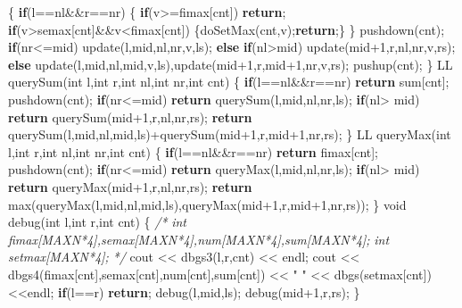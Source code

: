 \documentclass[
]{article}
\newenvironment{Shaded}{}{}
\newcommand{\CommentTok}[1]{\textcolor[rgb]{0.38,0.63,0.69}{\textit{#1}}}
\newcommand{\ControlFlowTok}[1]{\textcolor[rgb]{0.00,0.44,0.13}{\textbf{#1}}}
\newcommand{\DataTypeTok}[1]{\textcolor[rgb]{0.56,0.13,0.00}{#1}}
\newcommand{\DecValTok}[1]{\textcolor[rgb]{0.25,0.63,0.44}{#1}}
\newcommand{\NormalTok}[1]{#1}
\newcommand{\StringTok}[1]{\textcolor[rgb]{0.25,0.44,0.63}{#1}}
\begin{document}
\begin{Shaded}
\begin{Highlighting}[]
\NormalTok{\{}
    \ControlFlowTok{if}\NormalTok{(l==nl\&\&r==nr)}
\NormalTok{    \{}
        \ControlFlowTok{if}\NormalTok{(v\textgreater{}=fimax[cnt]) }\ControlFlowTok{return}\NormalTok{;}
        \ControlFlowTok{if}\NormalTok{(v\textgreater{}semax[cnt]\&\&v\textless{}fimax[cnt])}
\NormalTok{            \{doSetMax(cnt,v);}\ControlFlowTok{return}\NormalTok{;\}}
\NormalTok{    \}}
\NormalTok{    pushdown(cnt);}
    \ControlFlowTok{if}\NormalTok{(nr\textless{}=mid) update(l,mid,nl,nr,v,ls);}
    \ControlFlowTok{else} \ControlFlowTok{if}\NormalTok{(nl\textgreater{}mid) update(mid+}\DecValTok{1}\NormalTok{,r,nl,nr,v,rs);}
    \ControlFlowTok{else}\NormalTok{ update(l,mid,nl,mid,v,ls),update(mid+}\DecValTok{1}\NormalTok{,r,mid+}\DecValTok{1}\NormalTok{,nr,v,rs);}
\NormalTok{    pushup(cnt);}
\NormalTok{\}}
\NormalTok{LL querySum(}\DataTypeTok{int}\NormalTok{ l,}\DataTypeTok{int}\NormalTok{ r,}\DataTypeTok{int}\NormalTok{ nl,}\DataTypeTok{int}\NormalTok{ nr,}\DataTypeTok{int}\NormalTok{ cnt)}
\NormalTok{\{}
    \ControlFlowTok{if}\NormalTok{(l==nl\&\&r==nr) }\ControlFlowTok{return}\NormalTok{ sum[cnt];}
\NormalTok{    pushdown(cnt);}
    \ControlFlowTok{if}\NormalTok{(nr\textless{}=mid) }\ControlFlowTok{return}\NormalTok{ querySum(l,mid,nl,nr,ls);}
    \ControlFlowTok{if}\NormalTok{(nl\textgreater{} mid) }\ControlFlowTok{return}\NormalTok{ querySum(mid+}\DecValTok{1}\NormalTok{,r,nl,nr,rs);}
    \ControlFlowTok{return}\NormalTok{ querySum(l,mid,nl,mid,ls)+querySum(mid+}\DecValTok{1}\NormalTok{,r,mid+}\DecValTok{1}\NormalTok{,nr,rs);}
\NormalTok{\}}
\NormalTok{LL queryMax(}\DataTypeTok{int}\NormalTok{ l,}\DataTypeTok{int}\NormalTok{ r,}\DataTypeTok{int}\NormalTok{ nl,}\DataTypeTok{int}\NormalTok{ nr,}\DataTypeTok{int}\NormalTok{ cnt)}
\NormalTok{\{}
    \ControlFlowTok{if}\NormalTok{(l==nl\&\&r==nr) }\ControlFlowTok{return}\NormalTok{ fimax[cnt];}
\NormalTok{    pushdown(cnt);}
    \ControlFlowTok{if}\NormalTok{(nr\textless{}=mid) }\ControlFlowTok{return}\NormalTok{ queryMax(l,mid,nl,nr,ls);}
    \ControlFlowTok{if}\NormalTok{(nl\textgreater{} mid) }\ControlFlowTok{return}\NormalTok{ queryMax(mid+}\DecValTok{1}\NormalTok{,r,nl,nr,rs);}
    \ControlFlowTok{return}\NormalTok{ max(queryMax(l,mid,nl,mid,ls),queryMax(mid+}\DecValTok{1}\NormalTok{,r,mid+}\DecValTok{1}\NormalTok{,nr,rs));}
\NormalTok{\}}
\DataTypeTok{void}\NormalTok{ debug(}\DataTypeTok{int}\NormalTok{ l,}\DataTypeTok{int}\NormalTok{ r,}\DataTypeTok{int}\NormalTok{ cnt)}
\NormalTok{\{}
\CommentTok{/*}
\CommentTok{    int fimax[MAXN*4],semax[MAXN*4],num[MAXN*4],sum[MAXN*4];}
\CommentTok{    int setmax[MAXN*4];}
\CommentTok{*/}
\NormalTok{    cout \textless{}\textless{} dbgs3(l,r,cnt) \textless{}\textless{} endl;}
\NormalTok{    cout \textless{}\textless{} dbgs4(fimax[cnt],semax[cnt],num[cnt],sum[cnt]) \textless{}\textless{} }\StringTok{" "}\NormalTok{ \textless{}\textless{} dbgs(setmax[cnt]) \textless{}\textless{}endl;}
    \ControlFlowTok{if}\NormalTok{(l==r) }\ControlFlowTok{return}\NormalTok{;}
\NormalTok{    debug(l,mid,ls);}
\NormalTok{    debug(mid+}\DecValTok{1}\NormalTok{,r,rs);}
\NormalTok{\}}


\end{Highlighting}
\end{Shaded}
\end{document}
